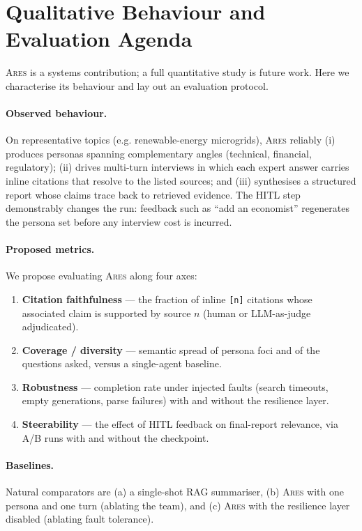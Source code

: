 \documentclass[10pt,twocolumn]{article}
\newcommand{\ares}{\textsc{Ares}}
\newcommand{\code}[1]{\texttt{\small #1}}
\begin{document}
\section{Qualitative Behaviour and Evaluation Agenda}
\label{sec:eval}

\ares{} is a systems contribution; a full quantitative study is future work.
Here we characterise its behaviour and lay out an evaluation protocol.

\paragraph{Observed behaviour.} On representative topics (e.g. renewable-energy
microgrids), \ares{} reliably (i) produces personas spanning complementary angles
(technical, financial, regulatory); (ii) drives multi-turn interviews in which
each expert answer carries inline citations that resolve to the listed sources;
and (iii) synthesises a structured report whose claims trace back to retrieved
evidence. The HITL step demonstrably changes the run: feedback such as ``add an
economist'' regenerates the persona set before any interview cost is incurred.

\paragraph{Proposed metrics.} We propose evaluating \ares{} along four axes:
\begin{enumerate}[leftmargin=1.2em,itemsep=1pt]
  \item \textbf{Citation faithfulness} --- the fraction of inline \code{[n]}
  citations whose associated claim is supported by source $n$ (human or
  LLM-as-judge adjudicated).
  \item \textbf{Coverage / diversity} --- semantic spread of persona foci and of
  the questions asked, versus a single-agent baseline.
  \item \textbf{Robustness} --- completion rate under injected faults (search
  timeouts, empty generations, parse failures) with and without the resilience
  layer.
  \item \textbf{Steerability} --- the effect of HITL feedback on final-report
  relevance, via A/B runs with and without the checkpoint.
\end{enumerate}

\paragraph{Baselines.} Natural comparators are (a) a single-shot RAG summariser,
(b) \ares{} with one persona and one turn (ablating the team), and (c) \ares{}
with the resilience layer disabled (ablating fault tolerance).
\end{document}
